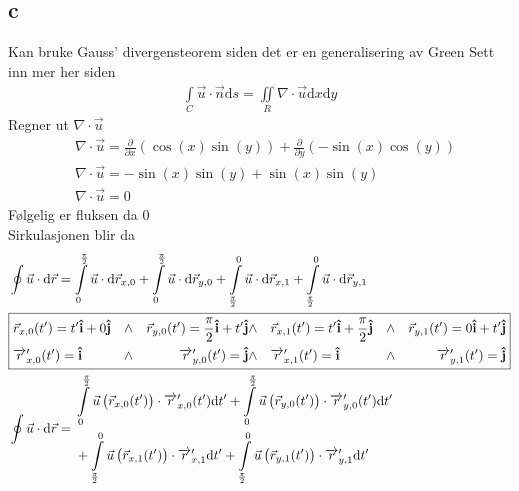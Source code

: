 \documentclass[a4paper,10pt,norsk]{article}
\newcommand{\dd}[1]{\mathrm{d}#1}
\newcommand{\uvec}[1]{\boldsymbol{\hat{\textbf{#1}}}}
\begin{document}
	\subsection*{c}
		Kan bruke Gauss' divergensteorem siden det er en generalisering av Green Sett inn mer her siden 
		\begin{align*}
			\int\limits_C \vec{u}  \cdot \vec{n} \dd{s} = \iint \limits_R \nabla \cdot \vec{u} \dd{x}\dd{y}
		\end{align*}
		Regner ut $\nabla \cdot \vec{u} $ 
		\begin{align*}
			&\nabla \cdot \vec{u} = \frac{\partial }{\partial x} \left( \cos(x) \sin(y)  \right) + \frac{\partial }{\partial y} \left( -\sin(x) \cos(y)  \right) \\
			&\nabla \cdot \vec{u} = - \sin(x) \sin(y) + \sin(x) \sin(y) \\
			&\nabla \cdot \vec{u} = 0
		\end{align*}
		Følgelig er fluksen da $0$\\
		Sirkulasjonen blir da
		\begin{align*}
			&\oint \vec{u}  \cdot \dd{\vec{r} } = \int\limits_0^{\frac{\pi}{2}} \vec{u} \cdot \dd{\vec{r}_{x,0} } + \int\limits_0^{\frac{\pi}{2}} \vec{u} \cdot \dd{\vec{r}_{y,0} }+  \int\limits_{\frac{\pi}{2}}^0 \vec{u} \cdot \dd{\vec{r}_{x,1} } + \int\limits_{\frac{\pi}{2}}^0 \vec{u} \cdot  \dd{\vec{r}_{y,1} }\\
			&\boxed{%
				\begin{aligned}
				&\vec{r}_{x,0}(t') = t' \uvec{i} + 0 \uvec{j} &\wedge&  &\vec{r}_{y,0}(t') = \frac{\pi}{2} \uvec{i} + t' \uvec{j} 
				&\wedge&  &\vec{r}_{x,1}(t') = t' \uvec{i} + \frac{\pi}{2}\uvec{j} &\wedge & &\vec{r}_{y,1}(t') = 0 \uvec{i} + t' \uvec{j}\\
				&\overrightarrow{r}'_{x,0}(t') = \uvec{i} &\wedge & &\overrightarrow{r}'_{y,0}(t') = \uvec{j}
				&\wedge & & \overrightarrow{r}'_{x,1}(t') = \uvec{i} &\wedge & & \overrightarrow{r}_{y,1}^{\prime} (t') = \uvec{j}
			\end{aligned}}\\
			&\oint \vec{u}  \cdot \dd{\vec{r} } =  
			\begin{aligned}
				&\int\limits_0^{\frac{\pi}{2}} \vec{u} \left( \vec{r}_{x,0}(t')  \right) \cdot \overrightarrow{r}'_{x,0}(t') \dd{t'} 
				+ \int\limits_0^{\frac{\pi}{2}} \vec{u} \left( \vec{r}_{y,0}(t')  \right) \cdot \overrightarrow{r}'_{y,0}(t') \dd{t'}\\
				&+ \int\limits_{\frac{\pi}{2}}^0 \vec{u} \left( \vec{r}_{x,1}(t') \right) \cdot \overrightarrow{r}'_{x,1} \dd{t'}
				+\int\limits_{\frac{\pi}{2}}^0 \vec{u} \left( \vec{r}_{y,1}(t') \right) \cdot \overrightarrow{r}'_{y,1} \dd{t'}\\
			\end{aligned}
		\end{align*}
\end{document}
